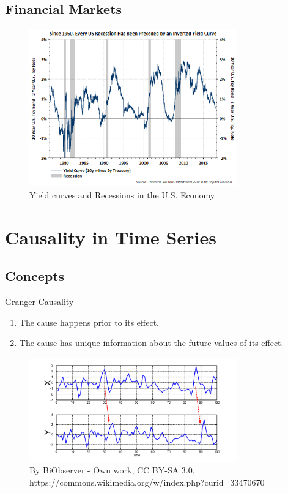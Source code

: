 \documentclass{beamer}
\begin{document}
\subsection{Financial Markets}

\begin{frame}
\begin{figure}[h]
        \includegraphics[width=0.80\textwidth]{spread-vs-stocks.png}
        \caption{Yield curves and Recessions in the U.S. Economy}
        \label{fig:fed-rate}
\end{figure}
\end{frame}

\section{Causality in Time Series}

\subsection{Concepts}

\begin{frame}{Granger Causality}
\begin{enumerate}
\item The cause happens prior to its effect.
\item The cause has unique information about the future values of its effect.
\end{enumerate}
\end{frame}

\begin{frame}
\begin{figure}[h]
        \includegraphics[width=0.80\textwidth]{GrangerCausality.png}
        \caption{By BiObserver - Own work, CC BY-SA 3.0, https://commons.wikimedia.org/w/index.php?curid=33470670}
        \label{fig:granger}
\end{figure}
\end{frame}
\end{document}
